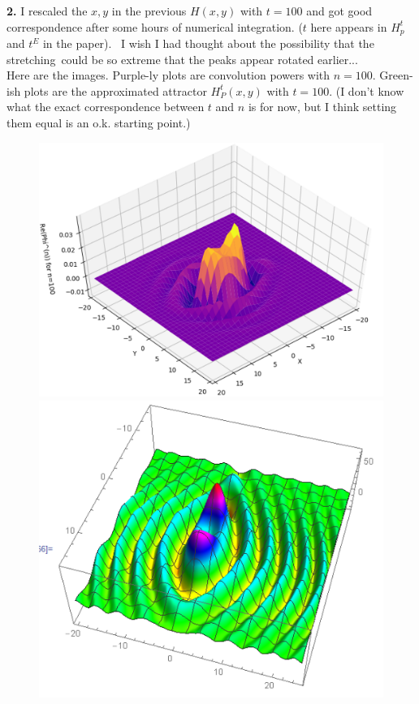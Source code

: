 \documentclass{article}
\theoremstyle{definition}
\begin{document}
\noindent \textbf{2.} I rescaled the $x,y$ in the previous $H(x,y)$ with $t = 100$ and got good correspondence after some hours of numerical integration. ($t$ here appears in $H^t_p$ and $t^E$ in the paper).  I wish I had thought about the possibility that the stretching could be so extreme that the peaks appear rotated earlier...\\

Here are the images. Purple-ly plots are convolution powers with $n = 100$. Green-ish plots are the approximated attractor $H^t_P(x,y)$ with $t = 100$. (I don't know what the exact correspondence between $t$ and $n$ is for now, but I think setting them equal is an o.k. starting point.)

\begin{figure}[!htb]
	\centering
	\includegraphics[scale=0.4]{conv}
	\includegraphics[scale=0.45]{conv-1}\\

\end{figure}
\end{document}
